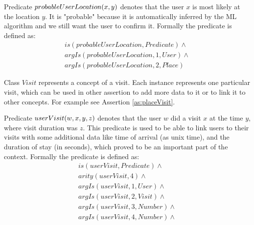 \begin{definition}
\label{pred:probableUserLocation}

Predicate $\\probableUserLocation(x,y)$ denotes that the user $x$ is most likely
at the location $y$. It is "probable" because it is automatically inferred by 
the ML algorithm and we still want the user to confirm it.
Formally the predicate is defined as:
\begin{equation}\label{as:probableUserLoc}
\begin{gathered}
    is(probableUserLocation,Predicate) \land \\
	argIs(probableUserLocation,1,User) \land\\
	argIs(probableUserLocation,2, Place)
\end{gathered}
\end{equation}
\end{definition}

\begin{definition}\label{def:visit}
Class $Visit$ represents a concept of a visit. Each instance represents one
particular visit, which can be used in other assertion to add more data to it
or to link it to other concepts. For example see Assertion 
\ref{as:placeVisit}.
\end{definition}

\begin{definition}
\label{pred:userVisit}
Predicate $\\userVisit(w,x,y,z)$ denotes that the user $w$ did a visit $x$
at the time $y$, where visit duration was $z$. This predicate is used to be 
able to link users to their visits with some additional data like time of
arrival (as unix time), and the duration of stay (in seconds), which proved to 
be an important part of the context. Formally the predicate is defined as:
\begin{equation}\label{as:userVisit}
\begin{gathered}
    is(userVisit,Predicate) \land \\
	arity(userVisit,4) \land \\
	argIs(userVisit,1,User) \land\\
	argIs(userVisit,2, Visit) \land \\
	argIs(userVisit,3,Number) \land \\
	argIs(userVisit,4,Number) \land
\end{gathered}
\end{equation}
\end{definition}


